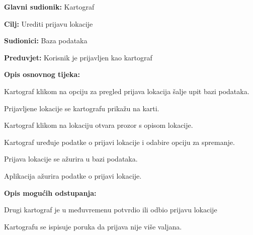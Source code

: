 				\noindent {}
				\begin{packed_item}
					
					\item \textbf{Glavni sudionik: }Kartograf
					\item  \textbf{Cilj:} Urediti prijavu lokacije
					\item  \textbf{Sudionici:} Baza podataka
					\item  \textbf{Preduvjet:} Korisnik je prijavljen kao kartograf
					\item  \textbf{Opis osnovnog tijeka:}
					
					\item[] \begin{packed_enum}
						
						\item Kartograf klikom na opciju za pregled prijava lokacija šalje upit bazi podataka.
						\item Prijavljene lokacije se kartografu prikažu na karti.
						\item Kartograf klikom na lokaciju otvara prozor s opisom lokacije.
						\item Kartograf uređuje podatke o prijavi lokacije i odabire opciju za spremanje.
						\item Prijava lokacije se ažurira u bazi podataka.
						\item Aplikacija ažurira podatke o prijavi lokacije.
					\end{packed_enum}
					
					\item  \textbf{Opis mogućih odstupanja:}
					
					\item[] \begin{packed_item}
						
						\item[4.a] Drugi kartograf je u međuvremenu potvrdio ili odbio prijavu lokacije
						\item[] \begin{packed_enum}
							
							\item Kartografu se ispisuje poruka da prijava nije više valjana.
							
						\end{packed_enum}
					\end{packed_item}
				\end{packed_item}


